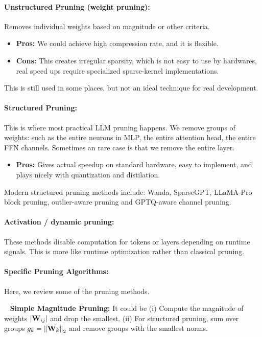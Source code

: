 \documentclass[11pt]{article}  %
\begin{document}
\paragraph{Unstructured Pruning (weight pruning):}
Removes individual weights based on magnitude or other criteria.

\begin{itemize}
  \item \textbf{Pros:} We could achieve high compression rate, and it is flexible.
  \item \textbf{Cons:} This creates irregular sparsity, which is not easy to use by hardwares, real speed ups require specialized sparse-kernel implementations.
\end{itemize}

This is still used in some places, but not an ideal technique for real development.

\paragraph{Structured Pruning:}
This is where most practical LLM pruning happens.
We remove groups of weights: such as the entire neurons in MLP, the entire attention head, the entire FFN channels. 
Sometimes an rare case is that we remove the entire layer.

\begin{itemize}
  \item \textbf{Pros:} Gives actual speedup on standard hardware, easy to implement, and plays nicely with quantization and distilation.
\end{itemize}

Modern structured pruning methods include: Wanda, SparseGPT, LLaMA-Pro block pruning, outlier-aware pruning and GPTQ-aware channel pruning.


\paragraph{Activation / dynamic pruning:}
These methods disable computation for tokens or layers depending on runtime signals.
This is more like runtime optimization rather than classical pruning.


\paragraph{Specific Pruning Algorithms:}
Here, we review some of the pruning methods.

\textbullet~ \textbf{Simple Magnitude Pruning:} It could be (i) Compute the magnitude of weights $\lvert \mathbf{W}_{ij} \rvert$ and drop the smallest. (ii) For structured pruning, sum over groups $g_k = \left\lVert \mathbf{W}_k \right\rVert_2$ and remove groups with the smallest norms.
\end{document}
